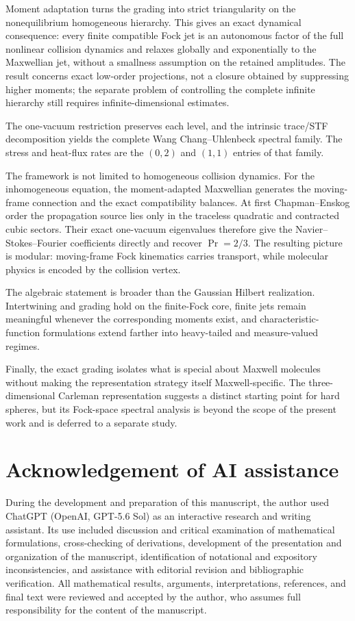 \documentclass[11pt,oneside]{article}
\numberwithin{equation}{section}
\theoremstyle{definition}
\begin{document}
Moment adaptation turns the grading into strict triangularity on the
nonequilibrium homogeneous hierarchy.  This gives an exact dynamical
consequence: every finite compatible Fock jet is an autonomous factor of
the full nonlinear collision dynamics and relaxes globally and
exponentially to the Maxwellian jet, without a smallness assumption on the
retained amplitudes.  The result concerns exact low-order projections, not
a closure obtained by suppressing higher moments; the separate problem of
controlling the complete infinite hierarchy still requires
infinite-dimensional estimates.

The one-vacuum restriction preserves each level, and the intrinsic
trace/STF decomposition yields the complete Wang Chang--Uhlenbeck spectral
family.  The stress and heat-flux rates are the $(0,2)$ and $(1,1)$ entries
of that family.

The framework is not limited to homogeneous collision dynamics.  For the
inhomogeneous equation, the moment-adapted Maxwellian generates the
moving-frame connection and the exact compatibility balances.  At first
Chapman--Enskog order the propagation source lies only in the traceless
quadratic and contracted cubic sectors.  Their exact one-vacuum
eigenvalues therefore give the Navier--Stokes--Fourier coefficients
directly and recover $\Pr=2/3$.  The resulting picture is modular:
moving-frame Fock kinematics carries transport, while molecular physics is
encoded by the collision vertex.

The algebraic statement is broader than the Gaussian Hilbert realization.
Intertwining and grading hold on the finite-Fock core, finite jets remain
meaningful whenever the corresponding moments exist, and
characteristic-function formulations extend farther into heavy-tailed and
measure-valued regimes.

Finally, the exact grading isolates what is special about Maxwell molecules without making the representation strategy itself Maxwell-specific.  The three-dimensional Carleman representation suggests a distinct starting point for hard spheres, but its Fock-space spectral analysis is beyond the scope of the present work and is deferred to a separate study.

\section*{Acknowledgement of AI assistance}
During the development and preparation of this manuscript, the author used
ChatGPT (OpenAI, GPT-5.6 Sol) as an interactive research and writing assistant.
Its use included discussion and critical examination of mathematical
formulations, cross-checking of derivations, development of the presentation
and organization of the manuscript, identification of notational and
expository inconsistencies, and assistance with editorial revision and
bibliographic verification.  All mathematical results, arguments,
interpretations, references, and final text were reviewed and accepted by the
author, who assumes full responsibility for the content of the manuscript.
\end{document}
